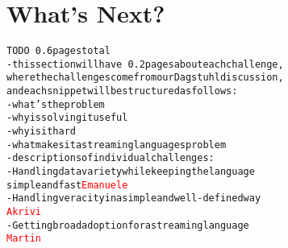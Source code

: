 \section{What's Next?}\label{sec:whatsnext}

\begin{alltt}TODO\scriptsize ~0.6 pages total
- this section will have ~0.2 pages about each challenge,
  where the challenges come from our Dagstuhl discussion,
  and each snippet will be structured as follows:
  - what's the problem
  - why is solving it useful
  - why is it hard
  - what makes it a streaming languages problem
- descriptions of individual challenges:
  - Handling data variety while keeping the language
    simple and fast \textcolor{red}{Emanuele}
  - Handling veracity in a simple and well-defined way
    \textcolor{red}{Akrivi}
  - Getting broad adoption for a streaming language
    \textcolor{red}{Martin}
\end{alltt}

